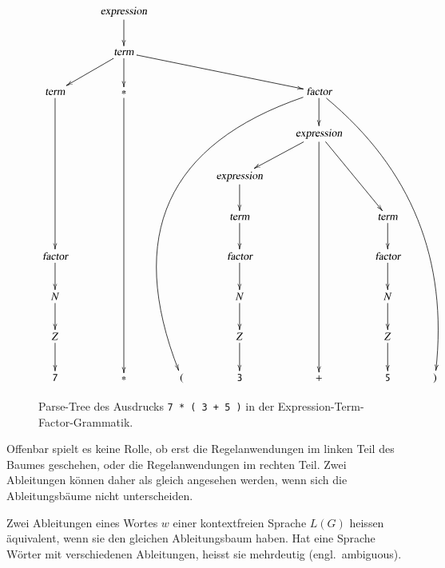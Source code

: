 \begin{figure}
{
\small
\[
\xymatrix{
	&\textsl{expression} \ar[d]
\\
	&\textsl{term} \ar[dl] \ar[d] \ar[drrr]
\\
\textsl{term}\ar[dddd]
	&{\tt *}\ar[ddddddd]
		&
			&
				&\textsl{factor}\ar@/_80pt/[dddddddll]\ar[d]\ar@/^40pt/[dddddddrr]
					&
						&
\\
	&
		&
			&
				&\textsl{expression}\ar[dl]\ar[dddddd]\ar[ddr]
					&
\\
	&
		&
			&\textsl{expression}\ar[d]
				&
					&
						&
\\
	&
		&
			&\textsl{term}\ar[d]
				&
					&\textsl{term}\ar[d]
						&
\\
\textsl{factor}\ar[d]
	&
		&
			&\textsl{factor}\ar[d]
				&
					&\textsl{factor}\ar[d]
						&
\\
N\ar[d]
	&
		&
			&N\ar[d]
				&
					&N\ar[d]
						&
\\
Z\ar[d]
	&
		&
			&Z\ar[d]
				&
					&Z\ar[d]
						&
\\
{\tt 7}
	&{\tt *}
		&{\tt (}
			&{\tt 3}
				&{\tt +}
					&{\tt 5}
						&{\tt )}
}
\]
}
\caption{Parse-Tree des Ausdrucks \texttt{7 * ( 3 + 5 )} in der
Expression-Term-Factor-Grammatik.
\label{etf-parse-tree}}
\end{figure}

Offenbar spielt es keine Rolle, ob erst die Regelanwendungen
im linken Teil des Baumes geschehen, oder die Regelanwendungen im
rechten Teil. Zwei Ableitungen können daher als gleich angesehen
werden, wenn sich die Ableitungsbäume nicht unterscheiden.

\begin{definition}
%
Zwei Ableitungen eines Wortes $w$ einer kontextfreien Sprache $L(G)$
heissen äquivalent, wenn sie den gleichen Ableitungsbaum haben.
Hat eine Sprache Wörter mit verschiedenen Ableitungen, heisst
sie mehrdeutig (engl.~ambiguous).
\end{definition}

